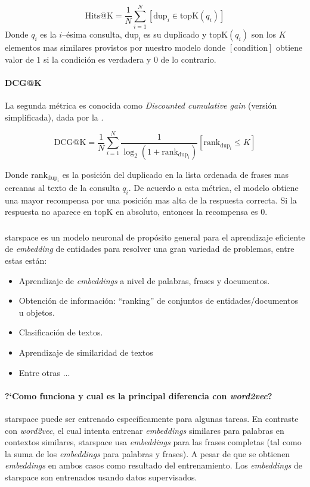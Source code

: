 \begin{equation} \label{eq:hits-k}
  \mathrm{Hits@K} = \frac{1}{N} \sum_{i=1}^{N} [\mathrm{dup}_i \in \mathrm{topK}(q_i)]
\end{equation}
Donde $q_i$ es la $i$--\'esima consulta, $\mathrm{dup_i}$ es su duplicado y $\mathrm{topK}(q_i)$ son los $K$ elementos mas similares provistos por nuestro modelo donde $[\mathrm{condition}]$ obtiene valor de $1$ si la condición es verdadera y $0$ de lo contrario.

\paragraph{DCG@K}
La segunda métrica es conocida como \emph{Discounted cumulative gain} (versión simplificada), dada por la .

\begin{equation} \label{eq:dcg-k}
  \mathrm{DCG@K} = \frac{1}{N} \sum_{i=1}^{N} \frac{1}{\log_2(1+\mathrm{rank}_{\mathrm{dup}_i})} [\mathrm{rank}_{\mathrm{dup}_i} \le K]
\end{equation}

Donde $\mathrm{rank}_{\mathrm{dup}_i}$ es la posición del duplicado en la lista ordenada de frases mas cercanas al texto de la consulta $q_i$. De acuerdo a esta métrica, el modelo obtiene una mayor recompensa por una posición mas alta de la respuesta correcta. Si la respuesta no aparece en $\mathrm{topK}$ en absoluto, entonces la recompensa es $0$.

\subsubsection{}
\gls{starspace} \cite{starspace} es un modelo neuronal de propósito general para el aprendizaje eficiente de \emph{embedding} de entidades para resolver una gran variedad de problemas, entre estas están:
\begin{itemize}
\item Aprendizaje de \emph{embeddings} a nivel de palabras, frases y documentos.
\item Obtención de información: ``ranking'' de conjuntos de entidades/documentos u objetos.
\item Clasificación de textos.
\item Aprendizaje de similaridad de textos
\item Entre otras ...
\end{itemize}

\paragraph{?`Como funciona y cual es la principal diferencia con \emph{word2vec}?}
\gls{starspace} puede ser entrenado específicamente para algunas tareas. En contraste con \emph{word2vec}, el cual intenta entrenar \emph{embeddings} similares para palabras en contextos similares, \gls{starspace} usa \emph{embeddings} para las frases completas (tal como la suma de los \emph{embeddings} para palabras y frases). A pesar de que se obtienen \emph{embeddings} en ambos casos como resultado del entrenamiento. Los \emph{embeddings} de \gls{starspace} son entrenados usando datos supervisados.

